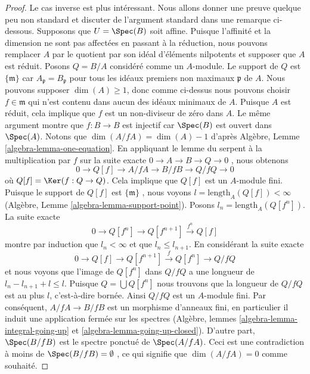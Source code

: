 \begin{proof}
\medskip\noindent
Le cas inverse est plus intéressant. Nous allons donner une preuve quelque peu non
standard et discuter de l'argument standard dans une remarque ci-dessous.
Supposons que  $U = \Spec(B)$  soit affine. Puisque l'affinité et la dimension ne sont
pas affectées en passant à la réduction, nous pouvons remplacer  $A$  par
le quotient par son idéal d'éléments nilpotents et supposer que  $A$  est
réduit. Posons  $Q = B/A$  considéré comme un  $A$-module. Le support de
 $Q$  est  $\{\mathfrak m\}$  car  $A_\mathfrak p = B_\mathfrak p$  pour tous les idéaux premiers non
maximaux  $\mathfrak p$  de  $A$. Nous pouvons supposer  $\dim(A) \geq 1$, donc
comme ci-dessus nous pouvons choisir  $f \in \mathfrak m$  qui n'est contenu dans aucun des
idéaux minimaux de  $A$. Puisque  $A$  est réduit, cela implique
que  $f$  est un non-diviseur de zéro dans  $A$. Le même
argument montre que  $f : B \to B$  est injectif car  $\Spec(B)$  est ouvert dans
 $\Spec(A)$. Notons que  $\dim(A/fA) = \dim(A) - 1$  d'après Algèbre, Lemme  \ref{algebra-lemma-one-equation}. En
appliquant le lemme du serpent à la multiplication par  $f$  sur la suite
exacte  $0 \to A \to B \to Q \to 0$ , nous obtenons
$$
0 \to Q[f] \to A/fA \to B/fB \to Q/fQ \to 0
$$
où  $Q[f] = \Ker(f : Q \to Q)$. Cela implique que  $Q[f]$  est un  $A$-module fini.
Puisque le support de  $Q[f]$  est  $\{\mathfrak m\}$ , nous voyons  $l = \text{length}_A(Q[f]) < \infty$ 
(Algèbre, Lemme  \ref{algebra-lemma-support-point}). Posons  $l_n = \text{length}_A(Q[f^n])$. La suite exacte
$$
0 \to Q[f^n] \to Q[f^{n + 1}] \xrightarrow{f^n} Q[f]
$$
montre par induction que  $l_n < \infty$  et que  $l_n \leq l_{n + 1}$. En considérant la suite
exacte
$$
0 \to Q[f] \to Q[f^{n + 1}] \xrightarrow{f} Q[f^n] \to Q/fQ
$$
et nous voyons que l'image de  $Q[f^n]$  dans  $Q/fQ$  a une longueur de
 $l_n - l_{n + 1} + l \leq l$. Puisque  $Q = \bigcup Q[f^n]$  nous trouvons que la longueur de  $Q/fQ$ 
est au plus  $l$, c'est-à-dire bornée. Ainsi  $Q/fQ$  est un
 $A$-module fini. Par conséquent,  $A/fA \to B/fB$  est un morphisme d'anneaux
fini, en particulier il induit une application fermée sur les spectres (Algèbre,
lemmes  \ref{algebra-lemma-integral-going-up}  et  \ref{algebra-lemma-going-up-closed}). D'autre part,  $\Spec(B/fB)$  est le spectre
ponctué de  $\Spec(A/fA)$. Ceci est une contradiction à moins de  $\Spec(B/fB) = \emptyset$ , ce qui
signifie que  $\dim(A/fA) = 0$  comme souhaité.
\end{proof}

